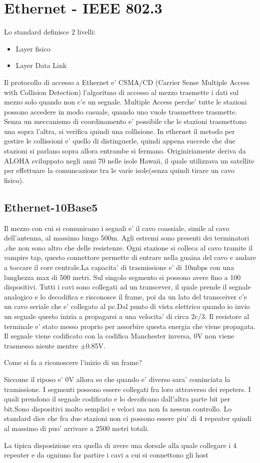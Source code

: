 \section{Ethernet - IEEE 802.3}
Lo standard definisce 2 livelli:
\begin{itemize}
  \item Layer fisico
  \item Layer Data Link
\end{itemize}
Il protocollo di accesso a Ethernet e' CSMA/CD (Carrier Sense Multiple Access with Collision Detection) l'algoritmo di accesso al mezzo trasmette i dati sul mezzo solo quando non c'e un segnale. Multiple Access perche' tutte le stazioni possono accedere in modo casuale, quando uno vuole trasmettere trasmette. Senza un meccanismo di coordinamento e' possibile che le stazioni trasmettono una sopra l'altra, si verifica quindi una collisione. In ethernet il metodo per gestire le collissioni e' quello di distinguerle, quindi appena succede che due stazioni si parlano sopra allora entrambe si fermano. Originiriamente deriva da ALOHA sviluppato negli anni 70 nelle isole Hawaii, il quale utilizzava un satellite per effettuare la comuncazione tra le varie isole(senza quindi tirare un cavo fisico).
\subsection{Ethernet-10Base5}
Il mezzo con cui si comunicano i segnali e' il cavo coassiale, simile al cavo dell'antenna, al massimo lungo 500m. Agli estremi sono presenti dei terminatori ,che non sono altro che delle resistenze. Ogni stazione si colleca al cavo tramite il vampire tap, questo connettore permette di entrare nella guaina del cavo e andare a toccare il core centrale.La capacita' di trasmissione e' di 10mbps con una lunghezza max di 500 metri. Sul singolo segmento si possono avere fino a 100 dispositivi. Tutti i cavi sono collegati ad un transcever, il quale prende il segnale analogico e lo decodifica e risconosce il frame, poi da un lato del transceiver c'e un cavo seriale che e' collegato al pc.Dal punto di vista elettrico quando io invio un segnale questo inizia a propagarsi a una velocita' di circa 2c/3. Il resistore al terminale e' stato messo proprio per assorbire questa energia che viene propagata. Il segnale viene codificato con la codifica Manchester inversa, 0V non viene trasmesso niente mentre $\pm$0.85V.
\begin{Question}
  Come si fa a riconoscere l'inizio di un frame?
\end{Question} 
Siccome il riposo e' 0V allora so che quando e' diverso sara' cominciata la tramissione.
I segmenti possono essere collegati fra loro attraverso dei repeters. I quali prendono il segnale codificato e lo decoficano dall'altra parte bit per bit.Sono dispositivi molto semplici e veloci ma non fa nessun controllo. Lo standard dice che fra due stazioni non ci possono essere piu' di 4 repeater quindi al massimo di puo' arrivare a 2500 metri totali.
\begin{example}
  La tipica disposizione era quella di avere una dorsale alla quale collegare i 4 repeater e da ogniuno far partire i cavi a cui si connettono gli host
\end{example}
